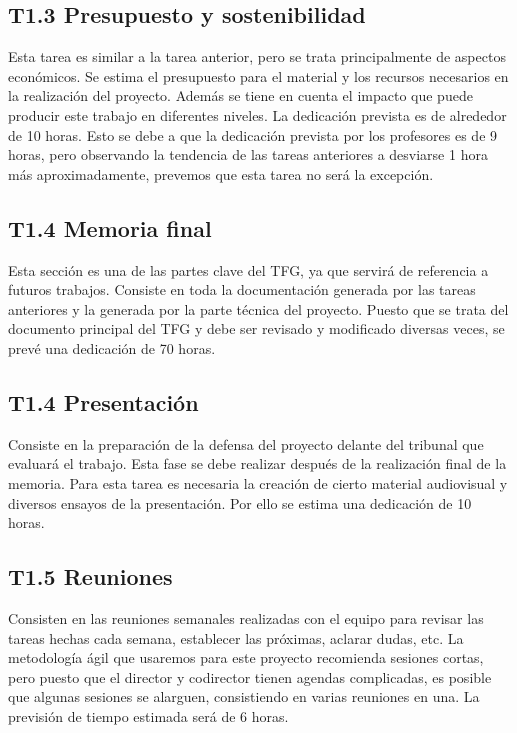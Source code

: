 \subsection*{T1.3 Presupuesto y sostenibilidad}
Esta tarea es similar a la tarea anterior, pero se trata principalmente de aspectos económicos. Se estima el presupuesto para el material y los recursos necesarios en la realización del proyecto. Además se tiene en cuenta el impacto que puede producir este trabajo en diferentes niveles. La dedicación prevista es de alrededor de 10 horas. Esto se debe a que la dedicación prevista por los profesores es de 9 horas, pero observando la tendencia de las tareas anteriores a desviarse 1 hora más aproximadamente, prevemos que esta tarea no será la excepción.

\subsection*{T1.4 Memoria final}
Esta sección es una de las partes clave del TFG, ya que servirá de referencia a futuros trabajos. Consiste en toda la documentación generada por las tareas anteriores y la generada por la parte técnica del proyecto. Puesto que se trata del documento principal del TFG y debe ser revisado y modificado diversas veces, se prevé una dedicación de 70 horas.

\subsection*{T1.4 Presentación}
Consiste en la preparación de la defensa del proyecto delante del tribunal que evaluará el trabajo. Esta fase se debe realizar después de la realización final de la memoria. Para esta tarea es necesaria la creación de cierto material audiovisual y diversos ensayos de la presentación. Por ello se estima una dedicación de 10 horas.

\subsection*{T1.5 Reuniones}
Consisten en las reuniones semanales realizadas con el equipo para revisar las tareas hechas cada semana, establecer las próximas, aclarar dudas, etc. La metodología ágil que usaremos para este proyecto recomienda sesiones cortas, pero puesto que el director y codirector tienen agendas complicadas, es posible que algunas sesiones se alarguen, consistiendo en varias reuniones en una. La previsión de tiempo estimada será de 6 horas.

